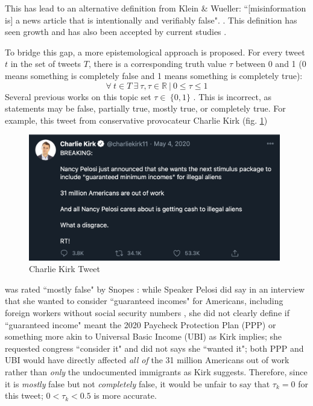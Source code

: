 \documentclass[preprint,review,12pt]{elsarticle}
\begin{document}
This has lead to an alternative definition from Klein \& Wueller: ``[misinformation is] a news article that is intentionally and verifiably false". \cite{klein2017fake}. This definition has seen growth and has also been accepted by current studies \cite{shu2017fake, liu2018early}.

To bridge this gap, a more epistemological approach is proposed. For every tweet $t$ in the set of tweets $T$, there is a corresponding truth value $\tau$ between 0 and 1 (0 means something is completely false and 1 means something is completely true):
\begin{equation}
\label{truthvalues}
    \forall \ t \in T \ \exists \ \tau, \tau \in \mathbb{R} \ | \ 0 \leq \tau \leq 1
\end{equation}
Several previous works on this topic set $\tau \in \ \{0,1\}$ \cite{liu2018early,shu2017fake}. This is incorrect, as statements may be false, partially true, mostly true, or completely true. For example, this tweet from conservative provocateur Charlie Kirk (fig. \ref{fig:Charlie Kirk Tweet, May 4, 2020})  \begin{figure}[h]
    \centering
    \includegraphics[width=11cm]{CharlieKirk Tweet.png}
    \caption{Charlie Kirk Tweet \cite{kirk2020tweet}}
    \label{fig:Charlie Kirk Tweet, May 4, 2020}
\end{figure} was rated ``mostly false" by Snopes \cite{lee2020pelosi}: while Speaker Pelosi did say in an interview that she wanted to consider ``guaranteed incomes" for Americans, including foreign workers without social security numbers \cite{pelosi2020maher}, she did not clearly define if ``guaranteed income" meant the 2020 Paycheck Protection Plan (PPP) or something more akin to Universal Basic Income (UBI) as Kirk implies; she requested congress ``consider it" and did not says she ``wanted it"; both PPP and UBI would have directly affected \textit{all of} the 31 million Americans out of work rather than \textit{only} the undocumented immigrants as Kirk suggests. Therefore, since it is \textit{mostly} false but not \textit{completely} false, it would be unfair to say that $\tau_k = 0$ for this tweet; $ 0 < \tau_k < 0.5$ is more accurate. 
\end{document}
